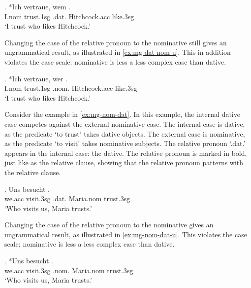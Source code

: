 \exg. *Ich vertraue, wem  .\\
I.\ac{nom} trust.1\ac{sg}\scsub{[dat]} .\ac{dat}. Hitchcock.\ac{acc} like.3\ac{sg}\scsub{[nom]}\\
`I trust who likes Hitchcock.' \label{ex:mg-dat-nom}

Changing the case of the relative pronoun to the nominative still gives an ungrammatical result, as illustrated in \ref{ex:mg-dat-nom-u}. This in addition violates the case scale: nominative is less a less complex case than dative.

\exg. *Ich vertraue, wer  .\\
I.\ac{nom} trust.1\ac{sg}\scsub{[dat]} .\ac{nom}. Hitchcock.\ac{acc} like.3\ac{sg}\scsub{[nom]}\\
`I trust who likes Hitchcock.' \label{ex:mg-dat-nom-u}

Consider the example in \ref{ex:mg-nom-dat}. In this example, the internal dative case competes against the external nominative case.
The internal case is dative, as the predicate  `to trust' takes dative objects.
The external case is nominative, as the predicate  `to visit' takes nominative subjects.
The relative pronoun  `.\ac{dat}.' appears in the internal case: the dative. The relative pronoun is marked in bold, just like as the relative clause, showing that the relative pronoun patterns with the relative clause.

\exg. Uns besucht   .\\
we.\ac{acc} visit.3\ac{sg}\scsub{[nom]} .\ac{dat}. Maria.\ac{nom} trust.3\ac{sg}\scsub{[dat]}\\
`Who visits us, Maria trusts.' \label{ex:mg-nom-dat}

Changing the case of the relative pronoun to the nominative gives an ungrammatical result, as illustrated in \ref{ex:mg-nom-dat-u}. This violates the case scale: nominative is less a less complex case than dative.

\exg. *Uns besucht   .\\
we.\ac{acc} visit.3\ac{sg}\scsub{[nom]} .\ac{nom}. Maria.\ac{nom} trust.3\ac{sg}\scsub{[dat]}\\
`Who visits us, Maria trusts.' \label{ex:mg-nom-dat-u}

